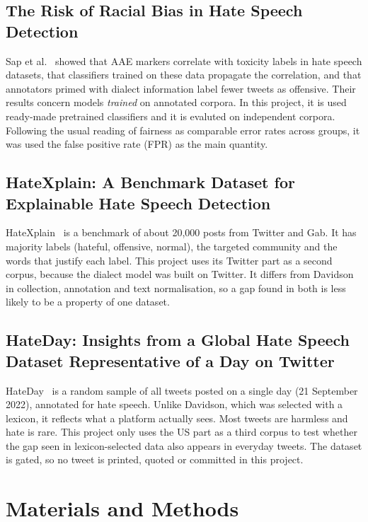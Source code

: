 \documentclass[runningheads,a4paper,oribibl]{llncs}
\begin{document}
\subsection{The Risk of Racial Bias in Hate Speech Detection}
Sap et al.~\cite{sap2019} showed that AAE markers correlate with toxicity labels in hate speech
datasets, that classifiers trained on these data propagate the correlation, and that annotators
primed with dialect information label fewer tweets as offensive. Their results concern models
\emph{trained} on annotated corpora. In this project, it is used ready-made pretrained classifiers 
and it is evaluted on independent corpora. Following the usual reading of fairness as comparable
error rates across groups, it was used the false positive rate (FPR) as the main quantity.

\subsection{HateXplain: A Benchmark Dataset for Explainable Hate Speech Detection}
HateXplain~\cite{mathew2021} is a benchmark of about 20,000 posts from Twitter and Gab. It has
majority labels (hateful, offensive, normal), the targeted community and the words that justify
each label. This project uses its Twitter part as a second corpus, because the dialect model
was built on Twitter. It differs from Davidson in collection, annotation and text normalisation,
so a gap found in both is less likely to be a property of one dataset.

\subsection{HateDay: Insights from a Global Hate Speech Dataset Representative of a Day on Twitter}
HateDay~\cite{tonneau2024} is a random sample of all tweets posted on a single day (21 September
2022), annotated for hate speech. Unlike Davidson, which was selected with a lexicon, it reflects
what a platform actually sees. Most tweets are harmless and hate is rare. This project only uses
the US part as a third corpus to test whether the gap seen in lexicon-selected data also appears
in everyday tweets. The dataset is gated, so no tweet is printed, quoted or committed in this project.

\section{Materials and Methods}\label{sec:methods}
\end{document}
